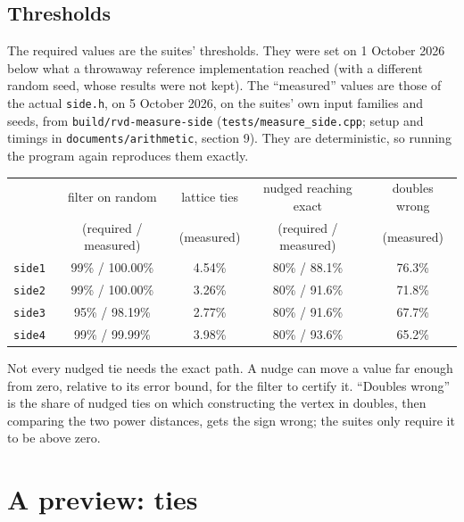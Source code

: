 \documentclass[11pt,a4paper]{article}
\newcommand{\code}[1]{\texttt{#1}}
\theoremstyle{remark}
\begin{document}
\subsection{Thresholds}

The required values are the suites' thresholds. They were set on 1 October 2026 below what a
throwaway reference implementation reached (with a different random seed, whose results were not
kept). The ``measured'' values are those of the actual \code{side.h}, on 5 October 2026, on the
suites' own input families and seeds, from \code{build/rvd-measure-side}
(\code{tests/measure\_side.cpp}; setup and timings in \code{documents/arithmetic}, section 9).
They are deterministic, so running the program again reproduces them exactly.

\begin{center}
\begin{tabular}{@{}lcccc@{}}
\toprule
 & filter on random & lattice ties & nudged reaching exact & doubles wrong \\
 & (required / measured) & (measured) & (required / measured) & (measured) \\
\midrule
\code{side1} & 99\% / 100.00\% & 4.54\% & 80\% / 88.1\% & 76.3\% \\
\code{side2} & 99\% / 100.00\% & 3.26\% & 80\% / 91.6\% & 71.8\% \\
\code{side3} & 95\% / 98.19\%  & 2.77\% & 80\% / 91.6\% & 67.7\% \\
\code{side4} & 99\% / 99.99\%  & 3.98\% & 80\% / 93.6\% & 65.2\% \\
\bottomrule
\end{tabular}
\end{center}

\noindent
Not every nudged tie needs the exact path. A nudge can move a value far enough from zero,
relative to its error bound, for the filter to certify it. ``Doubles wrong'' is the share of
nudged ties on which constructing the vertex in doubles, then comparing the two power distances,
gets the sign wrong; the suites only require it to be above zero.

\section{A preview: ties}\label{sec:ties}
\end{document}
